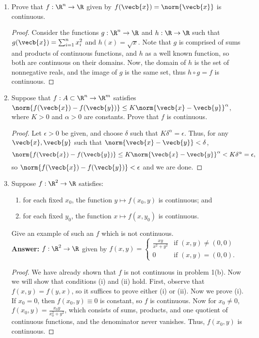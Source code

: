 \documentclass[letterpaper]{article}
\begin{document}
\begin{enumerate}
\item Prove that $f:\R^n\to \R$ given by $f(\vecb{x})=\norm{\vecb{x}}$ is continuous. 
\begin{proof}
Consider the functions $g:\R^n\to \R$ and $h:\R\to\R$ such that $g(\vecb{x})=\sum_{i=1}^n x_i^2$ and $h(x)=\sqrt{x}$.  Note that $g$ is comprised of sums and products of continuous functions, and $h$ as a well known function, so both are continuous on their domains. Now, the domain of $h$ is the set of nonnegative reals, and the image of $g$ is the same set, thus $h \circ g = f$ is continuous. 
\end{proof}

\item Suppose that $f:A\subset\R^n\to \R^m$ satisfies $\norm{f(\vecb{x})-f(\vecb{y})}\leq K\norm{\vecb{x}-\vecb{y}}^\alpha$, where $K>0$ and $\alpha>0$ are constants. Prove that $f$ is continuous. 
\begin{proof}
Let $\epsilon>0$ be given, and choose $\delta$ such that $K\delta^\alpha=\epsilon$. Thus, for any $\vecb{x},\vecb{y}$ such that $\norm{\vecb{x}-\vecb{y}}<\delta$, 
$$\norm{f(\vecb{x})-f(\vecb{y})}\leq K\norm{\vecb{x}-\vecb{y}}^\alpha<K\delta^\alpha=\epsilon,$$
so $\norm{f(\vecb{x})-f(\vecb{y})}<\epsilon$ and we are done. 
\end{proof}

\item Suppose $f:\R^2\to \R$ satisfies:
	\begin{enumerate}[label=(\roman*)]
	\item  for each fixed $x_0$, the function $y \mapsto f(x_0, y)$ is continuous; and
	\item  for each fixed $y_0$, the function $x \mapsto f(x, y_0)$ is continuous.
	\end{enumerate}
Give an example of such an $f$ which is not continuous.\\ 
\textbf{Answer: } $f:\R^2\to \R$ given by $f(x,y)=
	\begin{cases}
	\frac{xy}{x^2+y^2} & \text{if } (x,y)\neq(0,0)\\
	0 & \text{if } (x,y)=(0,0).
	\end{cases}$
\begin{proof}
We have already shown that $f$ is not continuous in problem 1(b). Now we will show that conditions (i) and (ii) hold. First, observe that $f(x,y)=f(y,x)$, so it suffices to prove either (i) or (ii). Now we prove (i). If $x_0=0$, then $f(x_0,y)\equiv0$ is constant, so $f$ is continuous. Now for $x_0\neq0$, $f(x_0,y)=\frac{x_0y}{x_0^2+y^2}$, which consists of sums, products, and one quotient of continuous functions, and the denominator never vanishes. Thus, $f(x_0,y)$ is continuous. 
\end{proof}


\end{enumerate}
\end{document}
